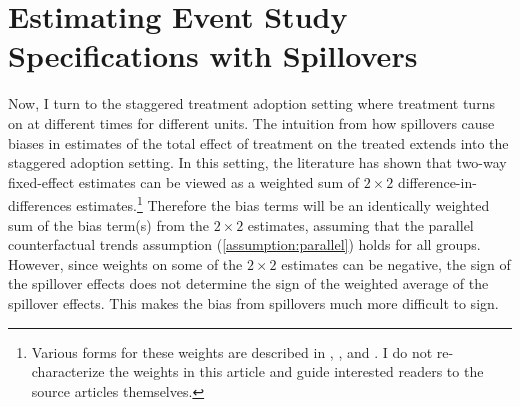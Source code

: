 \section{Estimating Event Study Specifications with Spillovers}
\label{sec:event_study}

Now, I turn to the staggered treatment adoption setting where treatment turns on at different times for different units. The intuition from how spillovers cause biases in estimates of the total effect of treatment on the treated extends into the staggered adoption setting. In this setting, the literature has shown that two-way fixed-effect estimates can be viewed as a weighted sum of $2 \times 2$ difference-in-differences estimates.\footnote{Various forms for these weights are described in \citet{Goodman-Bacon_2021}, \citet{sun2021estimating}, and \citet{dechaisemartin2020two}. I do not re-characterize the weights in this article and guide interested readers to the source articles themselves.} Therefore the bias terms will be an identically weighted sum of the bias term(s) from the $2 \times 2$ estimates, assuming that the parallel counterfactual trends assumption (\ref{assumption:parallel}) holds for all groups. However, since weights on some of the $2 \times 2$ estimates can be negative, the sign of the spillover effects does not determine the sign of the weighted average of the spillover effects. This makes the bias from spillovers much more difficult to sign. 

